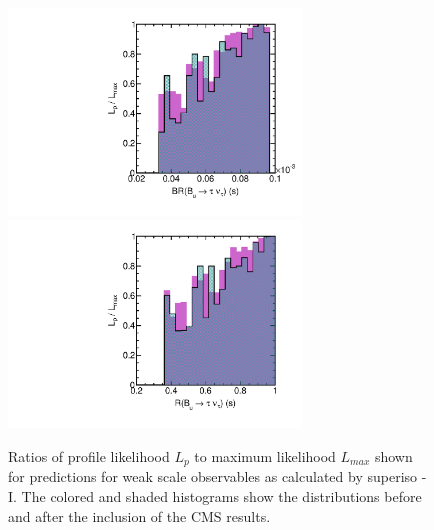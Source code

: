 \begin{figure}[htbp]
\begin{center}
\includegraphics[height=5.5cm]{figs/fig_Btaunu_s.pdf} 
\includegraphics[height=5.5cm]{figs/fig_RBtaunu_s.pdf} 
\caption{Ratios of profile likelihood $L_p$ to maximum likelihood $L_{max}$ shown for predictions for weak scale observables as calculated by superiso - I.  The colored and shaded histograms show the distributions before and after the inclusion of the CMS results.}
\label{fig:LRwcms_EWobs_s1}
\end{center}
\end{figure}


